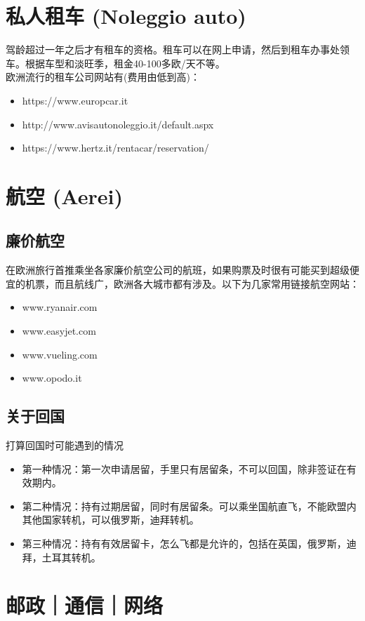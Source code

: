 \section{私人租车 (Noleggio auto)}
驾龄超过一年之后才有租车的资格。租车可以在网上申请，然后到租车办事处领车。根据车型和淡旺季，租金40-100多欧/天不等。\\
欧洲流行的租车公司网站有(费用由低到高)：
\begin{itemize}
\item https://www.europcar.it
\item http://www.avisautonoleggio.it/default.aspx 
\item https://www.hertz.it/rentacar/reservation/
\end{itemize}


\section{航空 (Aerei)}

\subsection{廉价航空}
在欧洲旅行首推乘坐各家廉价航空公司的航班，如果购票及时很有可能买到超级便宜的机票，而且航线广，欧洲各大城市都有涉及。以下为几家常用链接航空网站：
\begin{itemize}
\item www.ryanair.com
\item www.easyjet.com
\item www.vueling.com
\item www.opodo.it
\end{itemize}

\subsection{关于回国}
打算回国时可能遇到的情况
\begin{itemize}
\item 第一种情况：第一次申请居留，手里只有居留条，不可以回国，除非签证在有效期内。
\item 第二种情况：持有过期居留，同时有居留条。可以乘坐国航直飞，不能欧盟内其他国家转机，可以俄罗斯，迪拜转机。
\item 第三种情况：持有有效居留卡，怎么飞都是允许的，包括在英国，俄罗斯，迪拜，土耳其转机。
\end{itemize}

\section{邮政｜通信｜网络}

